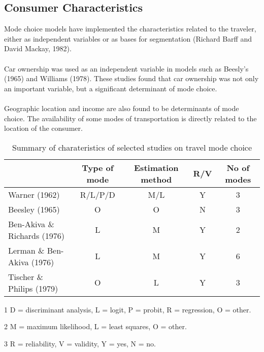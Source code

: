 \subsection{Consumer Characteristics}
Mode choice models have implemented the characteristics related to the traveler, either as independent variables or as bases for segmentation (Richard Barff and David Mackay, 1982).
\paragraph{}
Car ownership was used as an independent variable in models such as Beesly's (1965) and Williams (1978). These studies found that car ownership was not only an important variable, but a significant determinant of mode choice.
\paragraph{}
Geographic location and income are also found to be determinants of mode choice. The availability of some modes of transportation is directly related to the location of the consumer.
\\

\begin{table}[h!]
\centering
\begin{threeparttable}
\caption{Summary of charateristics of selected studies on travel mode choice}\label{table:7}
\begin{tabular}{lcccc}
\multicolumn{1}{l}{} \vline  & \multicolumn{1}{c}{Type of mode} & \multicolumn{1}{c}{Estimation method} & \multicolumn{1}{c}{R/V} & \multicolumn{1}{c}{No of modes}  \\ 
\hline
Warner (1962)  & R/L/P/D   & M/L & Y & 3 
\\
Beesley (1965) & O & O  & N & 3
\\
Ben-Akiva \& Richards (1976) & L & M & Y & 2
\\
Lerman \& Ben-Akiva (1976) & L & M & Y & 6
\\
Tischer \& Philips (1979)   & O & L & Y & 3
\end{tabular}
\begin{tablenotes}
        \item[1]D = discriminant analysis, L = logit, P = probit, R = regression, O = other.
        \item[2] M = maximum likelihood, L = least squares, O = other. 
        \item[3] R = reliability, V = validity, Y = yes, N = no.
        
    \end{tablenotes}
    \end{threeparttable}
\end{table}


